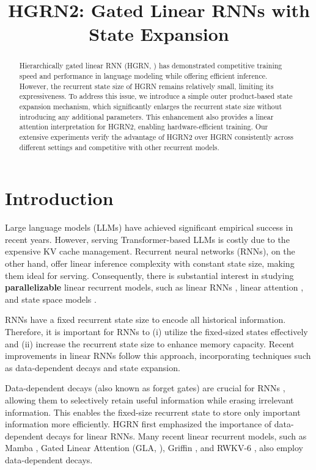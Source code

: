 \title{HGRN2: Gated Linear RNNs with State Expansion}

\begin{abstract}
Hierarchically gated linear RNN (HGRN, \citealt{HGRN}) has demonstrated competitive training speed and performance in language modeling while offering efficient inference. However, the recurrent state size of HGRN remains relatively small, limiting its expressiveness. To address this issue, we introduce a simple outer product-based state expansion mechanism, which significantly enlarges the recurrent state size without introducing any additional parameters. This enhancement also provides a linear attention interpretation for HGRN2, enabling hardware-efficient training. Our extensive experiments verify the advantage of HGRN2 over HGRN consistently across different settings and competitive with other recurrent models.
\end{abstract}

\section{Introduction}
Large language models (LLMs) have achieved significant empirical success in recent years. However, serving Transformer-based LLMs is costly due to the expensive KV cache management. Recurrent neural networks (RNNs), on the other hand, offer linear inference complexity with constant state size, making them ideal for serving. Consequently, there is substantial interest in studying \textbf{parallelizable} linear recurrent models, such as linear RNNs \citep{rwkv, LRU, HGRN, Griffin}, linear attention \citep{sun2023retentive, qin2023scaling, GLA, yang2024delta, based}, and state space models \citep{s4, s5, Gu2023MambaLS, Dao2024TransformersAS}.

RNNs have a fixed recurrent state size to encode all historical information. Therefore, it is important for RNNs to (i) utilize the fixed-sized states effectively and (ii) increase the recurrent state size to enhance memory capacity. Recent improvements in linear RNNs follow this approach, incorporating techniques such as data-dependent decays and state expansion.

Data-dependent decays (also known as forget gates) are crucial for RNNs \citep{unreasonable-forget-gate}, allowing them to selectively retain useful information while erasing irrelevant information. This enables the fixed-size recurrent state to store only important information more efficiently.  HGRN \citep{HGRN} first emphasized the importance of data-dependent decays for linear RNNs.  Many recent linear recurrent models, such as Mamba \citep{Gu2023MambaLS}, Gated Linear Attention (GLA, \citealt{GLA}), Griffin \citep{Griffin}, and RWKV-6 \citep{Peng2024EagleAF}, also employ data-dependent decays.

